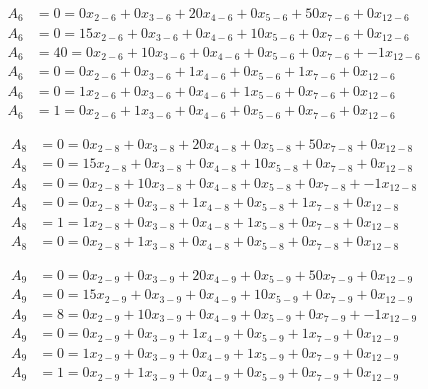 \vspace{-\baselineskip}\begin{align*}
	A_{6} &= 0 = 0x_{2-6} + 0x_{3-6} + 20x_{4-6} + 0x_{5-6} + 50x_{7-6} + 0x_{12-6} \\ 
	A_{6} &= 0 = 15x_{2-6} + 0x_{3-6} + 0x_{4-6} + 10x_{5-6} + 0x_{7-6} + 0x_{12-6} \\ 
	A_{6} &= 40 = 0x_{2-6} + 10x_{3-6} + 0x_{4-6} + 0x_{5-6} + 0x_{7-6} + -1x_{12-6} \\ 
	A_{6} &= 0 = 0x_{2-6} + 0x_{3-6} + 1x_{4-6} + 0x_{5-6} + 1x_{7-6} + 0x_{12-6} \\ 
	A_{6} &= 0 = 1x_{2-6} + 0x_{3-6} + 0x_{4-6} + 1x_{5-6} + 0x_{7-6} + 0x_{12-6} \\ 
	A_{6} &= 1 = 0x_{2-6} + 1x_{3-6} + 0x_{4-6} + 0x_{5-6} + 0x_{7-6} + 0x_{12-6}
\end{align*}

\vspace{-\baselineskip}\begin{align*}
	A_{8} &= 0 = 0x_{2-8} + 0x_{3-8} + 20x_{4-8} + 0x_{5-8} + 50x_{7-8} + 0x_{12-8} \\ 
	A_{8} &= 0 = 15x_{2-8} + 0x_{3-8} + 0x_{4-8} + 10x_{5-8} + 0x_{7-8} + 0x_{12-8} \\ 
	A_{8} &= 0 = 0x_{2-8} + 10x_{3-8} + 0x_{4-8} + 0x_{5-8} + 0x_{7-8} + -1x_{12-8} \\ 
	A_{8} &= 0 = 0x_{2-8} + 0x_{3-8} + 1x_{4-8} + 0x_{5-8} + 1x_{7-8} + 0x_{12-8} \\ 
	A_{8} &= 1 = 1x_{2-8} + 0x_{3-8} + 0x_{4-8} + 1x_{5-8} + 0x_{7-8} + 0x_{12-8} \\ 
	A_{8} &= 0 = 0x_{2-8} + 1x_{3-8} + 0x_{4-8} + 0x_{5-8} + 0x_{7-8} + 0x_{12-8}
\end{align*}

\vspace{-\baselineskip}\begin{align*}
	A_{9} &= 0 = 0x_{2-9} + 0x_{3-9} + 20x_{4-9} + 0x_{5-9} + 50x_{7-9} + 0x_{12-9} \\ 
	A_{9} &= 0 = 15x_{2-9} + 0x_{3-9} + 0x_{4-9} + 10x_{5-9} + 0x_{7-9} + 0x_{12-9} \\ 
	A_{9} &= 8 = 0x_{2-9} + 10x_{3-9} + 0x_{4-9} + 0x_{5-9} + 0x_{7-9} + -1x_{12-9} \\ 
	A_{9} &= 0 = 0x_{2-9} + 0x_{3-9} + 1x_{4-9} + 0x_{5-9} + 1x_{7-9} + 0x_{12-9} \\ 
	A_{9} &= 0 = 1x_{2-9} + 0x_{3-9} + 0x_{4-9} + 1x_{5-9} + 0x_{7-9} + 0x_{12-9} \\ 
	A_{9} &= 1 = 0x_{2-9} + 1x_{3-9} + 0x_{4-9} + 0x_{5-9} + 0x_{7-9} + 0x_{12-9}
\end{align*}


